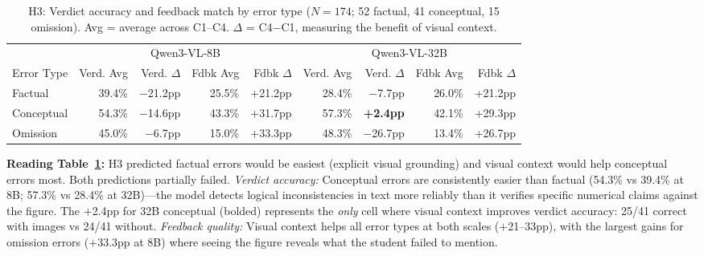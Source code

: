 \documentclass{article} %
\begin{document}
\begin{table}[H]
\centering
\small
\caption{H3: Verdict accuracy and feedback match by error type ($N{=}174$; 52 factual, 41 conceptual, 15 omission). Avg = average across C1--C4. $\Delta$ = C4$-$C1, measuring the benefit of visual context.}
\label{tab:h3}
\begin{tabular}{@{}lrrrrrrrr@{}}
\toprule
 & \multicolumn{4}{c}{Qwen3-VL-8B} & \multicolumn{4}{c}{Qwen3-VL-32B} \\
\cmidrule(lr){2-5} \cmidrule(l){6-9}
Error Type & Verd. Avg & Verd. $\Delta$ & Fdbk Avg & Fdbk $\Delta$ & Verd. Avg & Verd. $\Delta$ & Fdbk Avg & Fdbk $\Delta$ \\
\midrule
Factual     & 39.4\% & $-$21.2pp & 25.5\% & +21.2pp & 28.4\% & $-$7.7pp          & 26.0\% & +21.2pp \\
Conceptual  & 54.3\% & $-$14.6pp & 43.3\% & +31.7pp & 57.3\% & \textbf{+2.4pp}   & 42.1\% & +29.3pp \\
Omission    & 45.0\% & $-$6.7pp  & 15.0\% & +33.3pp & 48.3\% & $-$26.7pp         & 13.4\% & +26.7pp \\
\bottomrule
\end{tabular}
\end{table}

\noindent\textbf{Reading Table~\ref{tab:h3}:} H3 predicted factual errors would be easiest (explicit visual grounding) and visual context would help conceptual errors most. Both predictions partially failed. \textit{Verdict accuracy:} Conceptual errors are consistently easier than factual (54.3\% vs 39.4\% at 8B; 57.3\% vs 28.4\% at 32B)---the model detects logical inconsistencies in text more reliably than it verifies specific numerical claims against the figure. The $+$2.4pp for 32B conceptual (bolded) represents the \textit{only} cell where visual context improves verdict accuracy: 25/41 correct with images vs 24/41 without. \textit{Feedback quality:} Visual context helps all error types at both scales ($+$21--33pp), with the largest gains for omission errors ($+$33.3pp at 8B) where seeing the figure reveals what the student failed to mention.
\end{document}
